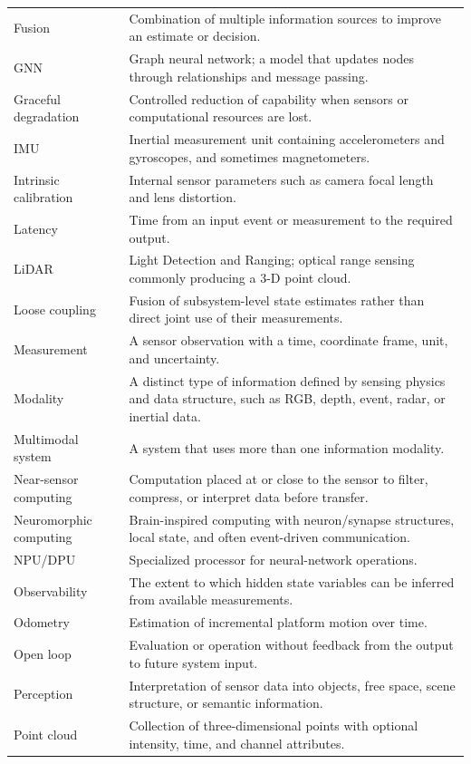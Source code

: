 \begin{longtable}{@{}p{3.6cm}p{10.1cm}@{}}
Fusion & Combination of multiple information sources to improve an estimate or decision. \\
GNN & Graph neural network; a model that updates nodes through relationships and message passing. \\
Graceful degradation & Controlled reduction of capability when sensors or computational resources are lost. \\
IMU & Inertial measurement unit containing accelerometers and gyroscopes, and sometimes magnetometers. \\
Intrinsic calibration & Internal sensor parameters such as camera focal length and lens distortion. \\
Latency & Time from an input event or measurement to the required output. \\
LiDAR & Light Detection and Ranging; optical range sensing commonly producing a 3-D point cloud. \\
Loose coupling & Fusion of subsystem-level state estimates rather than direct joint use of their measurements. \\
Measurement & A sensor observation with a time, coordinate frame, unit, and uncertainty. \\
Modality & A distinct type of information defined by sensing physics and data structure, such as RGB, depth, event, radar, or inertial data. \\
Multimodal system & A system that uses more than one information modality. \\
Near-sensor computing & Computation placed at or close to the sensor to filter, compress, or interpret data before transfer. \\
Neuromorphic computing & Brain-inspired computing with neuron/synapse structures, local state, and often event-driven communication. \\
NPU/DPU & Specialized processor for neural-network operations. \\
Observability & The extent to which hidden state variables can be inferred from available measurements. \\
Odometry & Estimation of incremental platform motion over time. \\
Open loop & Evaluation or operation without feedback from the output to future system input. \\
Perception & Interpretation of sensor data into objects, free space, scene structure, or semantic information. \\
Point cloud & Collection of three-dimensional points with optional intensity, time, and channel attributes. \\

\end{longtable}
